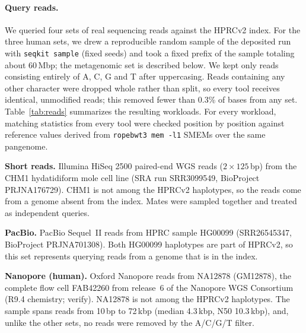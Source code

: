 
\paragraph{Query reads.}
We queried four sets of real sequencing reads against the HPRCv2 index.
For the three human sets, we drew a reproducible random sample of the deposited run with \texttt{seqkit sample} (fixed seeds) and took a fixed prefix of the sample totaling about 60\,Mbp; the metagenomic set is described below. We kept only reads consisting entirely of A, C, G and T after uppercasing.
Reads containing any other character were dropped whole rather than split, so every tool receives identical, unmodified reads; this removed fewer than 0.3\% of bases from any set.
Table~\ref{tab:reads} summarizes the resulting workloads.
For every workload, matching statistics from every tool were checked position by position against reference values derived from \texttt{ropebwt3 mem -l1} SMEMs over the same pangenome.

\textbf{Short reads.}
Illumina HiSeq 2500 paired-end WGS reads ($2\times125$\,bp) from the CHM1 hydatidiform mole cell line (SRA run SRR3099549, BioProject PRJNA176729).
CHM1 is not among the HPRCv2 haplotypes, so the reads come from a genome absent from the index.
Mates were sampled together and treated as independent queries.

\textbf{PacBio.}
PacBio Sequel~II reads from HPRC sample HG00099 (SRR26545347, BioProject PRJNA701308).
Both HG00099 haplotypes are part of HPRCv2, so this set represents querying reads from a genome that is in the index.

\textbf{Nanopore (human).}
Oxford Nanopore reads from NA12878 (GM12878), the complete flow cell FAB42260 from release~6 of the Nanopore WGS Consortium~\cite{jain2018nanopore} (R9.4 chemistry; verify).
NA12878 is not among the HPRCv2 haplotypes.
The sample spans reads from 10\,bp to 72\,kbp (median 4.3\,kbp, N50 10.3\,kbp), and, unlike the other sets, no reads were removed by the A/C/G/T filter.

